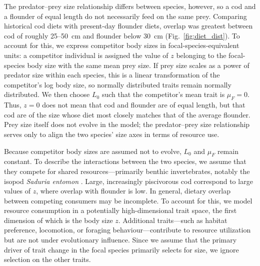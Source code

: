 \documentclass[12pt]{article}
\begin{document}
The predator--prey size relationship differs between species, however, so a cod and a flounder of equal length do not necessarily feed on the same prey. Comparing historical cod diets with present-day flounder diets, overlap was greatest between cod of roughly 25--50~cm and flounder below 30~cm (Fig.~\ref{fig:diet_dist}). To account for this, we express competitor body sizes in focal-species-equivalent units: a competitor individual is assigned the value of $z$ belonging to the focal-species body size with the same mean prey size. If prey size scales as a power of predator size within each species, this is a linear transformation of the competitor's log body size, so normally distributed traits remain normally distributed. We then choose $L_0$ such that the competitor's mean trait is $\mu_F = 0$. Thus, $z = 0$ does not mean that cod and flounder are of equal length, but that cod are of the size whose diet most closely matches that of the average flounder. Prey size itself does not evolve in the model; the predator--prey size relationship serves only to align the two species' size axes in terms of resource use.

Because competitor body sizes are assumed not to evolve, $L_0$ and $\mu_F$ remain constant. To describe the interactions between the two species, we assume that they compete for shared resources---primarily benthic invertebrates, notably the isopod \textit{Saduria entomon} \citep{Haase2020}. Large, increasingly piscivorous cod correspond to large values of $z$, where overlap with flounder is low. In general, dietary overlap between competing consumers may be incomplete. To account for this, we model resource consumption in a potentially high-dimensional trait space, the first dimension of which is the body size $z$. Additional traits---such as habitat preference, locomotion, or foraging behaviour---contribute to resource utilization but are not under evolutionary influence. Since we assume that the primary driver of trait change in the focal species primarily selects for size, we ignore selection on the other traits.
\end{document}
